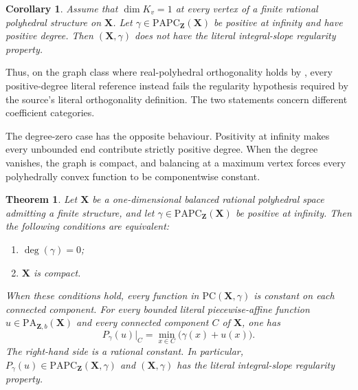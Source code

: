 \documentclass[11pt,a4paper]{article}
\newtheorem{theorem}{Theorem}[section]
\newtheorem{corollary}[corollary]{Corollary}
\theoremstyle{definition}
\theoremstyle{remark}
\begin{document}
\begin{corollary}
\label{cor:frontier-polyhedral-rank-one-graph-integral-nonregularity}
Assume that $\dim K_v=1$ at every vertex of a finite rational polyhedral
structure on $\mathbf X$.  Let
$\gamma\in\mathrm{PAPC}_{\mathbf Z}(\mathbf X)$ be positive at infinity
and have positive degree.  Then $(\mathbf X,\gamma)$ does not have the
literal integral-slope regularity property.
\end{corollary}

Thus, on the graph class where real-polyhedral orthogonality holds by
, every
positive-degree literal reference instead fails the regularity hypothesis
required by the source's literal orthogonality definition.  The two
statements concern different coefficient categories.








The degree-zero case has the opposite behaviour.  Positivity at infinity
makes every unbounded end contribute strictly positive degree.  When the
degree vanishes, the graph is compact, and balancing at a maximum vertex
forces every polyhedrally convex function to be componentwise constant.



\begin{theorem}
\label{thm:frontier-polyhedral-zero-degree-integral-regularity}
Let $\mathbf X$ be a one-dimensional balanced rational polyhedral space
admitting a finite structure, and let
$\gamma\in\mathrm{PAPC}_{\mathbf Z}(\mathbf X)$ be positive at infinity.
Then the following conditions are equivalent:
\begin{enumerate}
\item $\deg(\gamma)=0$;
\item $\mathbf X$ is compact.
\end{enumerate}
When these conditions hold, every function in
$\mathrm{PC}(\mathbf X,\gamma)$ is constant on each connected component.
For every bounded literal piecewise-affine function
$u\in\mathrm{PA}_{\mathbf Z,b}(\mathbf X)$ and every connected component
$C$ of $\mathbf X$, one has
\begin{equation}
 P_\gamma(u)|_C
   =\min_{x\in C}\bigl(\gamma(x)+u(x)\bigr).
 \label{eq:frontier-polyhedral-zero-degree-envelope}
\end{equation}
The right-hand side is a rational constant.  In particular,
$P_\gamma(u)\in\mathrm{PAPC}_{\mathbf Z}(\mathbf X,\gamma)$ and
$(\mathbf X,\gamma)$ has the literal integral-slope regularity property.
\end{theorem}
\end{document}
